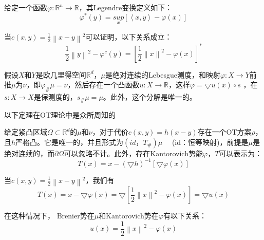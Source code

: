 \begin{definition}[Legendre变换]	\label{definition:3.4}
	给定一个函数$\varphi : \mathbb{R}^n \to \mathbb{R}$，其Legendre变换定义如下：
	\begin{equation}
		\varphi ^*(y)=\underset{x}{sup}\left [ \left \langle x,y \right \rangle -\varphi (x) \right ]  
		\label{function:14}
	\end{equation}

	当$c(x,y)=\frac{1}{2} \left \| x-y \right \| ^2 $可以证明，以下关系成立：
	\begin{equation}
		\frac{1}{2}\left \| y \right \|^2-\varphi ^c (y)=\left [ \frac{1}{2} \left \| x \right \| ^2-\varphi (x) \right ]^*  
		\label{function:15}
	\end{equation}
\end{definition}

\begin{theorem}[Briener极分解【44】]	\label{theorem:3.2}
	假设$X$和$Y$是欧几里得空间$\mathbb{R}^d$，$\mu$是绝对连续的Lebesgue测度，和映射$\varphi : X\to Y$前推$\mu$为$\nu$，即$\varphi _{\#}\mu=\nu$，然后存在一个凸函数$u: X \to \mathbb{R}$，这样$\varphi=\bigtriangledown u(x)\circ s $ ，在$s: X \to X$是保测度的，$s_{\#}\mu=\mu$。此外，这个分解是唯一的。
\end{theorem}

以下定理在OT理论中是众所周知的
\begin{theorem}[Villani【44】]	\label{theorem:3.3}
	给定紧凸区域$\Omega \subset \mathbb{R}^d$的$\mu$和$\nu$，对于代价$c(x,y)=h(x-y)$存在一个OT方案$\rho$，且$h$严格凸。它是唯一的，并且形式为$(id，T_{\#})\mu \quad$ (id：恒等映射)，前提是$\mu$是绝对连续的，而$\partial \Omega$可以忽略不计。此外，存在Kantorovich势能$\varphi$，$T$可以表示为：
	\begin{equation*}
		T(x)=x-(\bigtriangledown h)^{-1} \left [ \bigtriangledown \varphi (x) \right ] 
	\end{equation*}

	当$c(x,y)=\frac{1}{2} \left \| x-y \right \|^2 $，我们有
	\begin{equation*}
		T(x)=x- \bigtriangledown \varphi (x)= \bigtriangledown \left [ \frac{1}{2} \left \| x \right \| ^2 - \varphi(x) \right ] =  \bigtriangledown u(x)
	\end{equation*}

	在这种情况下， Brenier势在$\mu$和Kantorovich势在$\varphi$有以下关系：
	\begin{equation}
		u(x)=\frac{1}{2} \left \| x \right \| ^2 -\varphi (x)
		\label{function:16}
	\end{equation}
\end{theorem}

